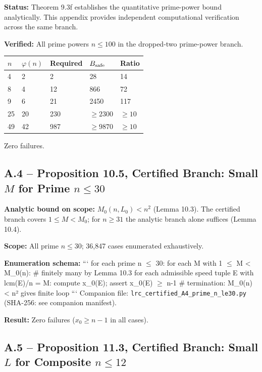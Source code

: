 \documentclass[11pt,a4paper]{article}
\theoremstyle{plain}
\theoremstyle{definition}
\theoremstyle{remark}
\begin{document}
\textbf{Status:} Theorem 9.3f establishes the quantitative prime-power bound analytically. This appendix provides independent computational verification across the same branch.

\textbf{Verified:} All prime powers $n \leq 100$ in the dropped-two prime-power branch.


\begin{center}\begin{tabular}{lllll}
\toprule
$n$ & $\varphi(n)$ & Required & $B_{\rm safe}$ & Ratio \\
\midrule
4 & 2 & 2 & 28 & 14 \\
8 & 4 & 12 & 866 & 72 \\
9 & 6 & 21 & 2450 & 117 \\
25 & 20 & 230 & $\geq 2300$ & $\geq 10$ \\
49 & 42 & 987 & $\geq 9870$ & $\geq 10$ \\
\bottomrule
\end{tabular}\end{center}


Zero failures.


\subsection{A.4 -- Proposition 10.5, Certified Branch: Small $M$ for Prime $n \leq 30$}


\textbf{Analytic bound on scope:} $M_0(n, L_0) < n^2$ (Lemma 10.3). The certified branch covers $1 \leq M < M_0$; for $n \geq 31$ the analytic branch alone suffices (Lemma 10.4).

\textbf{Scope:} All prime $n \leq 30$; 36,847 cases enumerated exhaustively.

\textbf{Enumeration schema:}
```
for each prime n $\leq$ 30:
  for each M with 1 $\leq$ M < M\_0(n):          \# finitely many by Lemma 10.3
    for each admissible speed tuple E with lcm(E)/n = M:
      compute x\_0(E); assert x\_0(E) $\geq$ n-1
  \# termination: M\_0(n) < n² gives finite loop
```
Companion file: \texttt{lrc\_certified\_A4\_prime\_n\_le30.py} (SHA-256: see companion manifest).

\textbf{Result:} Zero failures ($x_0 \geq n-1$ in all cases).


\subsection{A.5 -- Proposition 11.3, Certified Branch: Small $L$ for Composite $n \leq 12$}
\end{document}
